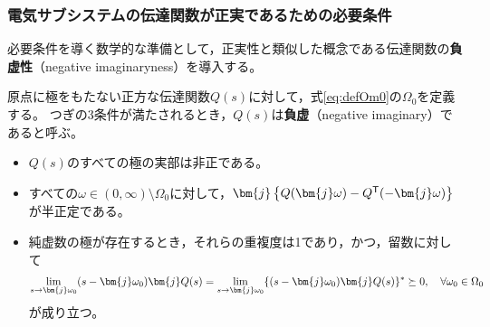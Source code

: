\documentclass[tombow,dvipdfmx]{corona-a5-1.1}
\begin{document}
\subsubsection{電気サブシステムの伝達関数が正実であるための必要条件}


必要条件を導く数学的な準備として，正実性と類似した概念である伝達関数の\textbf{負虚性}（negative imaginaryness）を導入する\cite{petersen2010feedback,xiong2010negative}。

\begin{定義}[伝達関数の負虚性]
\label{def:trni}
原点に極をもたない正方な伝達関数$Q(s)$に対して，式\ref{eq:defOm0}の$\Omega_0$を定義する。
つぎの3条件が満たされるとき，$Q(s)$は\textbf{負虚}（negative imaginary）であると呼ぶ。
\begin{itemize}
\item $Q(s)$のすべての極の実部は非正である。
\item すべての$\omega \in (0,\infty)\setminus \Omega_0$に対して，$\bm{j}\left\{Q(\bm{j} \omega) - Q^{\sf T}(-\bm{j} \omega) \right\}$が半正定である。
\item 純虚数の極が存在するとき，それらの重複度は1であり，かつ，留数に対して
\begin{align*}
\lim_{s \rightarrow \bm{j} \omega_0} (s-\bm{j} \omega_0) \bm{j} Q(s) = 
\lim_{s\rightarrow \bm{j} \omega_0} \{ (s-\bm{j} \omega_0) \bm{j} Q(s)\}^{\sf *}\succeq 0
,\quad
\forall \omega_0 \in \Omega_0
\end{align*}
が成り立つ。
\end{itemize}
\end{定義}
\end{document}
